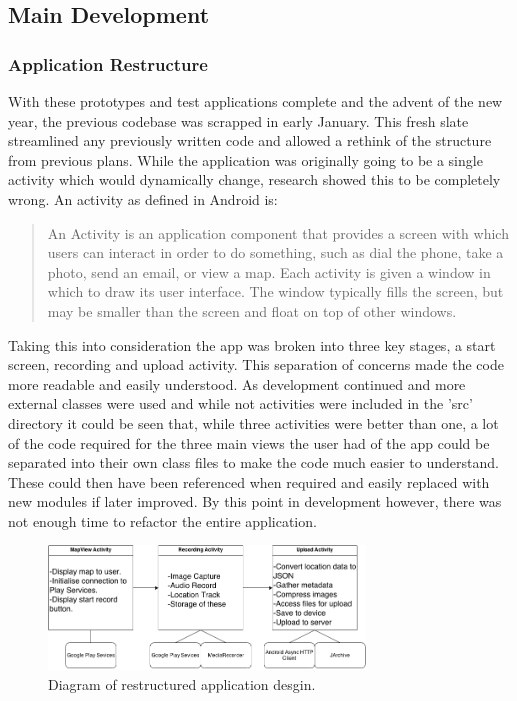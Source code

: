 \documentclass{l3proj}
\begin{document}
\subsection{Main Development}
\subsubsection{Application Restructure}
With these prototypes and test applications complete and the advent of the new year, the previous codebase was scrapped in early January. This fresh slate streamlined any previously written code and allowed a rethink of the structure from previous plans. While the application was originally going to be a single activity which would dynamically change, research showed this to be completely wrong. An activity as defined in Android is:

\blockquote{An Activity is an application component that provides a screen with which users can interact in order to do something, such as dial the phone, take a photo, send an email, or view a map. Each activity is given a window in which to draw its user interface. The window typically fills the screen, but may be smaller than the screen and float on top of other windows.}

Taking this into consideration the app was broken into three key stages, a start screen, recording and upload activity. This separation of concerns made the code more readable and easily understood. As development continued and more external classes were used and while not activities were included in the 'src' directory it could be seen that, while three activities were better than one, a lot of the code required for the three main views the user had of the app could be separated into their own class files to make the code much easier to understand. These could then have been referenced when required and easily replaced with new modules if later improved. By this point in development however, there was not enough time to refactor the entire application.

\begin{figure}[ht!]
\centering
\includegraphics[width=0.75\textwidth]{images/android-app-structure.png}
\caption{Diagram of restructured application desgin.}
\end{figure}
\end{document}
